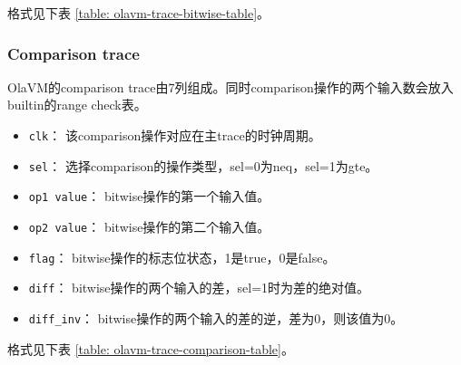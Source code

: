 格式见下表 \ref{table: olavm-trace-bitwise-table}。

\begin{table}[!ht]
    \centering {}
    \caption{OlaVM的bitwise的trace表结构}
    \label{table: olavm-trace-bitwise-table}
\end{table}

\subsubsection{Comparison trace}\label{subsubsec: olavm-comparison-trace}
OlaVM的comparison trace由7列组成。同时comparison操作的两个输入数会放入builtin的range check表。
\begin{itemize}
    \item \verb|clk|： 该comparison操作对应在主trace的时钟周期。
    \item \verb|sel|： 选择comparison的操作类型，sel=0为neq，sel=1为gte。
    \item \verb|op1 value|： bitwise操作的第一个输入值。
    \item \verb|op2 value|： bitwise操作的第二个输入值。
    \item \verb|flag|： bitwise操作的标志位状态，1是true，0是false。
    \item \verb|diff|： bitwise操作的两个输入的差，sel=1时为差的绝对值。
    \item \verb|diff_inv|： bitwise操作的两个输入的差的逆，差为0，则该值为0。
\end{itemize}

格式见下表 \ref{table: olavm-trace-comparison-table}。

\begin{table}[!ht]
    \centering {}
    \caption{OlaVM的comparison的trace表结构}
    \label{table: olavm-trace-comparison-table}
\end{table}